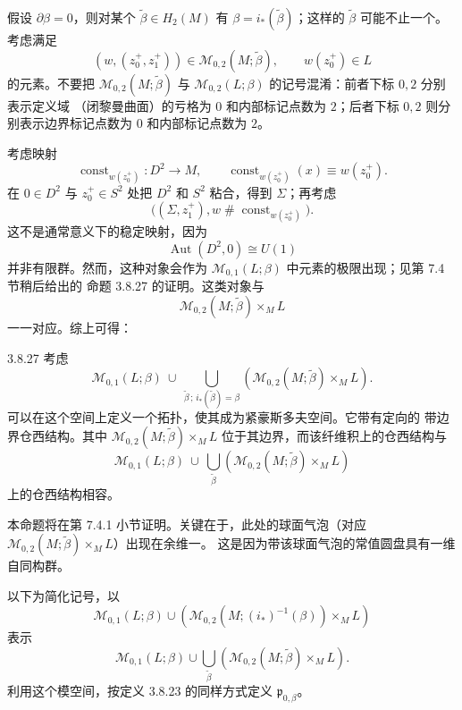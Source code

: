 假设 $\partial\beta=0$，则对某个
$\widetilde\beta\in H_2(M)$ 有
$\beta=i_*(\widetilde\beta)$；这样的 $\widetilde\beta$ 可能不止一个。
考虑满足
\[
 (w,(z_0^+,z_1^+))
 \in\mathcal M_{0,2}(M;\widetilde\beta),
 \qquad w(z_0^+)\in L
\]
的元素。不要把
$\mathcal M_{0,2}(M;\widetilde\beta)$ 与
$\mathcal M_{0,2}(L;\beta)$ 的记号混淆：前者下标 $0,2$ 分别表示定义域
（闭黎曼曲面）的亏格为 $0$ 和内部标记点数为 $2$；后者下标 $0,2$
则分别表示边界标记点数为 $0$ 和内部标记点数为 $2$。

考虑映射
\[
 \operatorname{const}_{w(z_0^+)}\colon D^2\longrightarrow M,
 \qquad
 \operatorname{const}_{w(z_0^+)}(x)\equiv w(z_0^+).
\]
在 $0\in D^2$ 与 $z_0^+\in S^2$ 处把 $D^2$ 和 $S^2$ 粘合，得到
$\Sigma$；再考虑
\[
 \bigl((\Sigma,z_1^+),
 w\mathbin{\#}\operatorname{const}_{w(z_0^+)}\bigr).
\]
这不是通常意义下的稳定映射，因为
\[
 \operatorname{Aut}(D^2,0)\cong U(1)
\]
并非有限群。然而，这种对象会作为
$\mathcal M_{0,1}(L;\beta)$ 中元素的极限出现；见第 7.4 节稍后给出的
命题 3.8.27 的证明。这类对象与
\[
 \mathcal M_{0,2}(M;\widetilde\beta)\mathbin{\times_M}L
\]
一一对应。综上可得：

\begin{proposition}{3.8.27}\label{prop:3-8-27}
考虑
\[
 \mathcal M_{0,1}(L;\beta)
 \ \cup\
 \bigcup_{\widetilde\beta\,;\,i_*(\widetilde\beta)=\beta}
 \left(
 \mathcal M_{0,2}(M;\widetilde\beta)\mathbin{\times_M}L
 \right).
\]
可以在这个空间上定义一个拓扑，使其成为紧豪斯多夫空间。它带有定向的
带边界仓西结构。其中
$\mathcal M_{0,2}(M;\widetilde\beta)\mathbin{\times_M}L$
位于其边界，而该纤维积上的仓西结构与
\[
 \mathcal M_{0,1}(L;\beta)
 \ \cup\
 \bigcup_{\widetilde\beta}
 \left(
 \mathcal M_{0,2}(M;\widetilde\beta)\mathbin{\times_M}L
 \right)
\]
上的仓西结构相容。
\end{proposition}

本命题将在第 7.4.1 小节证明。关键在于，此处的球面气泡（对应
$\mathcal M_{0,2}(M;\widetilde\beta)\mathbin{\times_M}L$）出现在余维一。
这是因为带该球面气泡的常值圆盘具有一维自同构群。

以下为简化记号，以
\[
 \mathcal M_{0,1}(L;\beta)
 \cup
 \left(
 \mathcal M_{0,2}(M;(i_*)^{-1}(\beta))
 \mathbin{\times_M}L
 \right)
\]
表示
\[
 \mathcal M_{0,1}(L;\beta)
 \cup
 \bigcup_{\widetilde\beta}
 \left(
 \mathcal M_{0,2}(M;\widetilde\beta)\mathbin{\times_M}L
 \right).
\]
利用这个模空间，按定义 3.8.23 的同样方式定义
$\mathfrak p_{0,\beta}$。

